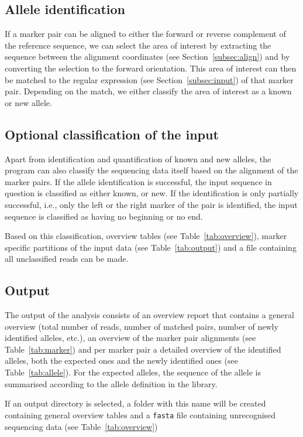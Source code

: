 \documentclass{article}
\begin{document}
\subsection{Allele identification}
If a marker pair can be aligned to either the forward or reverse complement of
the reference sequence, we can select the area of interest by extracting the
sequence between the alignment coordinates (see Section~\ref{subsec:align}) and
by converting the selection to the forward orientation. This area of interest
can then be matched to the regular expression (see Section~\ref{subsec:input})
of that marker pair. Depending on the match, we either classify the area of
interest as a known or new allele.

\subsection{Optional classification of the input} \label{subsec:class}
Apart from identification and quantification of known and new alleles, the
program can also classify the sequencing data itself based on the alignment of
the marker pairs. If the allele identification is successful, the input
sequence in question is classified as either known, or new. If the
identification is only partially successful, i.e., only the left or the right
marker of the pair is identified, the input sequence is classified as having no
beginning or no end.

Based on this classification, overview tables (see
Table~\ref{tab:overview}), marker specific partitions of the input data (see
Table~\ref{tab:output}) and a file containing all unclassified reads can be
made.

\subsection{Output}
The output of the analysis consists of an overview report that contains a
general overview (total number of reads, number of matched pairs, number of
newly identified alleles, etc.), an overview of the marker pair alignments
(see Table~\ref{tab:marker}) and per marker pair a detailed overview of the
identified alleles, both the expected ones and the newly identified ones (see
Table~\ref{tab:allele}). For the expected alleles, the sequence of the allele
is summarised according to the allele definition in the library.

If an output directory is selected, a folder with this name will be created
containing general overview tables and a \texttt{fasta} file containing
unrecognised sequencing data (see Table~\ref{tab:overview})
\end{document}
